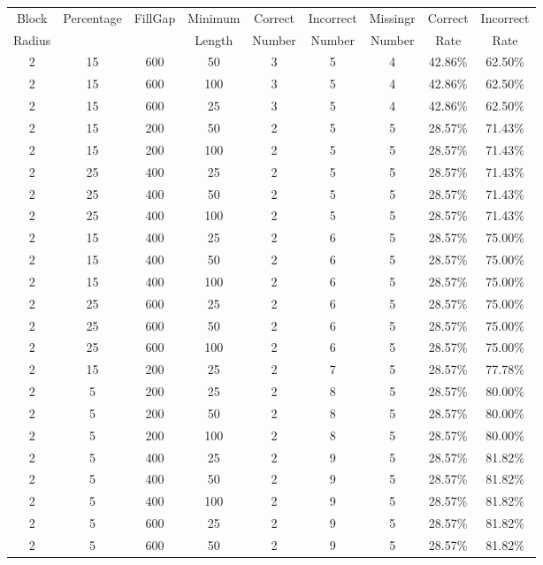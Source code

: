 \documentclass[11pt]{article}
\begin{document}
\begin{center}
{\small
\begin{longtable}{| c | c | c | c | c | c | c | c | c |} \hline 
Block & Percentage & FillGap & Minimum & Correct & Incorrect & Missingr & Correct & Incorrect \\ 
Radius &  & & Length & Number & Number & Number & Rate & Rate \\ \hline
 2 & 15 & 600 & 50 & 3 & 5 & 4 & 42.86\% & 62.50\%   \\
 2 & 15 & 600 & 100 & 3 & 5 & 4 & 42.86\% & 62.50\%   \\
 2 & 15 & 600 & 25 & 3 & 5 & 4 & 42.86\% & 62.50\%   \\
 2 & 15 & 200 & 50 & 2 & 5 & 5 & 28.57\% & 71.43\%   \\
 2 & 15 & 200 & 100 & 2 & 5 & 5 & 28.57\% & 71.43\%   \\
 2 & 25 & 400 & 25 & 2 & 5 & 5 & 28.57\% & 71.43\%   \\
 2 & 25 & 400 & 50 & 2 & 5 & 5 & 28.57\% & 71.43\%   \\
 2 & 25 & 400 & 100 & 2 & 5 & 5 & 28.57\% & 71.43\%   \\
 2 & 15 & 400 & 25 & 2 & 6 & 5 & 28.57\% & 75.00\%   \\
 2 & 15 & 400 & 50 & 2 & 6 & 5 & 28.57\% & 75.00\%   \\
 2 & 15 & 400 & 100 & 2 & 6 & 5 & 28.57\% & 75.00\%   \\
 2 & 25 & 600 & 25 & 2 & 6 & 5 & 28.57\% & 75.00\%   \\
 2 & 25 & 600 & 50 & 2 & 6 & 5 & 28.57\% & 75.00\%   \\
 2 & 25 & 600 & 100 & 2 & 6 & 5 & 28.57\% & 75.00\%   \\
 2 & 15 & 200 & 25 & 2 & 7 & 5 & 28.57\% & 77.78\%   \\
 2 & 5 & 200 & 25 & 2 & 8 & 5 & 28.57\% & 80.00\%   \\
 2 & 5 & 200 & 50 & 2 & 8 & 5 & 28.57\% & 80.00\%   \\
 2 & 5 & 200 & 100 & 2 & 8 & 5 & 28.57\% & 80.00\%   \\
 2 & 5 & 400 & 25 & 2 & 9 & 5 & 28.57\% & 81.82\%   \\
 2 & 5 & 400 & 50 & 2 & 9 & 5 & 28.57\% & 81.82\%   \\
 2 & 5 & 400 & 100 & 2 & 9 & 5 & 28.57\% & 81.82\%   \\
 2 & 5 & 600 & 25 & 2 & 9 & 5 & 28.57\% & 81.82\%   \\
 2 & 5 & 600 & 50 & 2 & 9 & 5 & 28.57\% & 81.82\%   \\

\end{longtable}}
\end{center}
\end{document}
